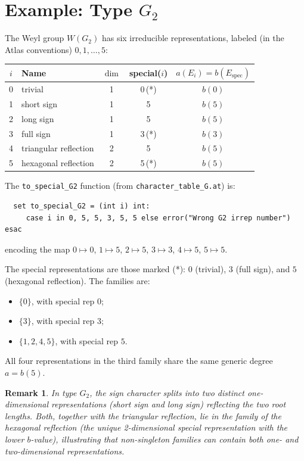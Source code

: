 \documentclass[12pt]{amsart}
\newtheorem{remark}[theorem]{Remark}
\begin{document}
\section{Example: Type $G_2$}

The Weyl group $W(G_2)$ has six irreducible representations, labeled
(in the Atlas conventions) $0, 1, \ldots, 5$:

\medskip
\begin{center}
\begin{tabular}{clccc}
\hline
$i$ & Name & $\dim$ & special($i$) & $a(E_i) = b(E_{\text{spec}})$ \\
\hline
0 & trivial              & 1 & 0\,(*) & $b(0)$ \\
1 & short sign           & 1 & 5      & $b(5)$ \\
2 & long sign            & 1 & 5      & $b(5)$ \\
3 & full sign            & 1 & 3\,(*) & $b(3)$ \\
4 & triangular reflection & 2 & 5     & $b(5)$ \\
5 & hexagonal reflection  & 2 & 5\,(*) & $b(5)$ \\
\hline
\end{tabular}
\end{center}
\medskip

The \texttt{to\_special\_G2} function (from \texttt{character\_table\_G.at}) is:
\begin{verbatim}
  set to_special_G2 = (int i) int:
     case i in 0, 5, 5, 3, 5, 5 else error("Wrong G2 irrep number") esac
\end{verbatim}
encoding the map $0\mapsto 0$, $1\mapsto 5$, $2\mapsto 5$, $3\mapsto 3$,
$4\mapsto 5$, $5\mapsto 5$.

The special representations are those marked (*): $0$ (trivial), $3$ (full
sign), and $5$ (hexagonal reflection).  The families are:
\begin{itemize}
  \item $\{0\}$, with special rep $0$;
  \item $\{3\}$, with special rep $3$;
  \item $\{1, 2, 4, 5\}$, with special rep $5$.
\end{itemize}
All four representations in the third family share the same generic degree
$a = b(5)$.

\begin{remark}
  In type $G_2$, the sign character splits into two distinct one-dimensional
  representations (short sign and long sign) reflecting the two root lengths.
  Both, together with the triangular reflection, lie in the family of the
  hexagonal reflection (the unique 2-dimensional special representation with
  the lower $b$-value), illustrating that non-singleton families can contain
  both one- and two-dimensional representations.
\end{remark}
\end{document}
